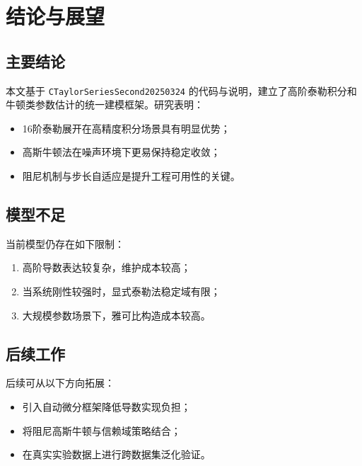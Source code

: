\chapter{结论与展望}

\section{主要结论}
本文基于 \texttt{CTaylorSeriesSecond20250324} 的代码与说明，建立了高阶泰勒积分和牛顿类参数估计的统一建模框架。研究表明：
\begin{itemize}
  \item 16阶泰勒展开在高精度积分场景具有明显优势；
  \item 高斯牛顿法在噪声环境下更易保持稳定收敛；
  \item 阻尼机制与步长自适应是提升工程可用性的关键。
\end{itemize}

\section{模型不足}
当前模型仍存在如下限制：
\begin{enumerate}
  \item 高阶导数表达较复杂，维护成本较高；
  \item 当系统刚性较强时，显式泰勒法稳定域有限；
  \item 大规模参数场景下，雅可比构造成本较高。
\end{enumerate}

\section{后续工作}
后续可从以下方向拓展：
\begin{itemize}
  \item 引入自动微分框架降低导数实现负担；
  \item 将阻尼高斯牛顿与信赖域策略结合；
  \item 在真实实验数据上进行跨数据集泛化验证。
\end{itemize}
